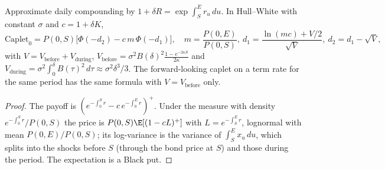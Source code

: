 \begin{omfigure}

\label{fig:rc:modelling-overnight-rate-products:timing}
\end{omfigure}

\begin{proposition}\label{prop:rc:modelling-overnight-rate-products:hw}
Approximate daily compounding by $1+\delta R = \exp\int_S^Er_u\,du$. In Hull--White
with constant $\sigma$ and $c = 1+\delta K$,
\[
\mathrm{Caplet}_0 = P(0,S)\bigl[\Phi(-d_2) - c\,m\,\Phi(-d_1)\bigr],\quad
m = \frac{P(0,E)}{P(0,S)},\ d_1 = \frac{\ln(mc)+V/2}{\sqrt V},\ d_2 = d_1-\sqrt V,
\]
with $V = V_{\text{before}}+V_{\text{during}}$,
$V_{\text{before}} = \sigma^2B(\delta)^2\frac{1-e^{-2\kappa S}}{2\kappa}$ and
$V_{\text{during}} = \sigma^2\int_0^\delta B(\tau)^2\,d\tau\approx\sigma^2\delta^3/3$. The
forward-looking caplet on a term rate for the same period has the same formula
with $V = V_{\text{before}}$ only.
\end{proposition}
\begin{proof}
The payoff is $(e^{-\int_0^Sr}-c\,e^{-\int_0^Er})^+$. Under the measure with density
$e^{-\int_0^Sr}/P(0,S)$ the price is $P(0,S)\E[(1-cL)^+]$ with
$L=e^{-\int_S^Er}$, lognormal with mean $P(0,E)/P(0,S)$; its log-variance is the
variance of $\int_S^Ex_u\,du$, which splits into the shocks before $S$ (through the
bond price at $S$) and those during the period. The expectation is a Black put.
\end{proof}

